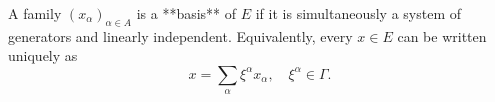 A family $(x_\alpha)_{\alpha \in A}$ is a **basis** of $E$ if it is simultaneously a system of generators and linearly independent. Equivalently, every $x \in E$ can be written uniquely as
$$x = \sum_\alpha \xi^\alpha x_\alpha, \quad \xi^\alpha \in \Gamma.$$

